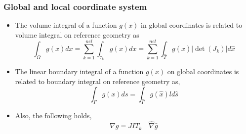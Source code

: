 \documentclass{beamer}
\begin{document}

\begin{frame}
\frametitle{Global and local coordinate system}
\begin{itemize}

\item The volume integral of a function $g(x)$ in global coordinates is related to volume integral on reference geometry as 
\begin{equation}\label{integral_local_global_volume}
\int_\Omega g(x) dx = \sum_{k=1}^{nel} \int_{\tau_k} g(x) dx = \sum_{k=1}^{nel} \int_{\hat{T}} g(\hat{x}) |\det(J_k)| d \hat{x}
\end{equation}

\item The linear boundary integral of a function $g(x)$ on global coordinates is related to boundary integral on reference geometry as, 
\begin{equation}\label{integral_local_global_boundary}
\int_{\Gamma} g(x) ds = \int_{\hat{\Gamma}} g(\hat{x}) ld \hat{s}
\end{equation}

\item Also, the following holds,
\begin{equation}\label{derivative_transformation}
\nabla g = JIT_k \quad \hat{\nabla} \hat{g} 
\end{equation}

\end{itemize}

\end{frame}

\end{document}
